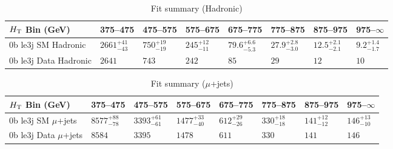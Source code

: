 \documentclass[8pt]{article}
\def\scalht{\mbox{$H_{\rm{T}}$}\xspace}
\newcommand\T{\rule{0pt}{2.6ex}}
\begin{document}
\begin{table}[ht!]
\caption{Fit summary (Hadronic)}
\label{tab:ensemble-summary}
\centering
\begin{tabular}{ llllllll }

\hline
\scalht Bin (GeV)       & 375--475                       & 475--575                       & 575--675                       & 675--775                       & 775--875                       & 875--975                       & 975--$\infty$                  \\ [1.000000ex]
\hline
0b le3j SM Hadronic\T   & $2661^{+41}_{-43}$             & $750^{+19}_{-19}$              & $245^{+12}_{-11}$              & $79.6^{+6.6}_{-5.3}$           & $27.9^{+2.8}_{-3.0}$           & $12.5^{+2.1}_{-2.1}$           & $9.2^{+1.4}_{-1.7}$            \\ 
0b le3j Data Hadronic\T & $2641$                         & $743$                          & $242$                          & $85$                           & $29$                           & $12$                           & $10$                           \\ 
\hline

\end{tabular}
\end{table}
\begin{table}[ht!]
\caption{Fit summary ($\mu$+jets)}
\label{tab:ensemble-summary}
\centering
\begin{tabular}{ llllllll }

\hline
\scalht Bin (GeV)       & 375--475                       & 475--575                       & 575--675                       & 675--775                       & 775--875                       & 875--975                       & 975--$\infty$                  \\ [1.000000ex]
\hline
0b le3j SM $\mu$+jets\T & $8577^{+88}_{-78}$             & $3393^{+61}_{-61}$             & $1477^{+33}_{-40}$             & $612^{+29}_{-26}$              & $330^{+18}_{-18}$              & $141^{+12}_{-12}$              & $146^{+13}_{-10}$              \\ 
0b le3j Data $\mu$+jets\T & $8584$                         & $3395$                         & $1478$                         & $611$                          & $330$                          & $141$                          & $146$                          \\ 
\hline

\end{tabular}
\end{table}
\end{document}
